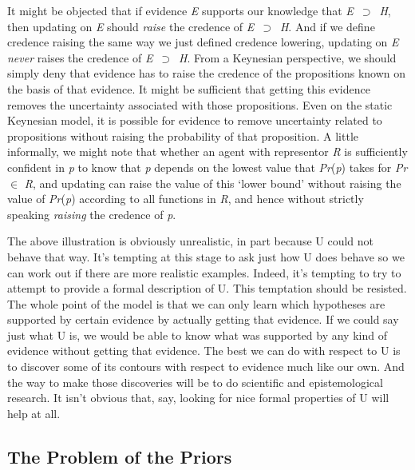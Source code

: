 \documentclass[
  11pt,
  letterpaper,
  DIV=11,
  numbers=noendperiod,
  oneside]{scrartcl}
\begin{document}
It might be objected that if evidence \emph{E} supports our knowledge
that \emph{E}~\({\supset}\)~\emph{H}, then updating on \emph{E} should
\emph{raise} the credence of \emph{E}~\({\supset}\)~\emph{H}. And if we
define credence raising the same way we just defined credence lowering,
updating on \emph{E} \emph{never} raises the credence of
\emph{E}~\({\supset}\)~\emph{H}. From a Keynesian perspective, we should
simply deny that evidence has to raise the credence of the propositions
known on the basis of that evidence. It might be sufficient that getting
this evidence removes the uncertainty associated with those
propositions. Even on the static Keynesian model, it is possible for
evidence to remove uncertainty related to propositions without raising
the probability of that proposition. A little informally, we might note
that whether an agent with representor \emph{R} is sufficiently
confident in \emph{p} to know that \emph{p} depends on the lowest value
that \emph{Pr}(\emph{p}) takes for \emph{Pr} \({\in}\) \emph{R}, and
updating can raise the value of this `lower bound' without raising the
value of \emph{Pr}(\emph{p}) according to all functions in \emph{R}, and
hence without strictly speaking \emph{raising} the credence of \emph{p}.

The above illustration is obviously unrealistic, in part because U could
not behave that way. It's tempting at this stage to ask just how U does
behave so we can work out if there are more realistic examples. Indeed,
it's tempting to try to attempt to provide a formal description of U.
This temptation should be resisted. The whole point of the model is that
we can only learn which hypotheses are supported by certain evidence by
actually getting that evidence. If we could say just what U is, we would
be able to know what was supported by any kind of evidence without
getting that evidence. The best we can do with respect to U is to
discover some of its contours with respect to evidence much like our
own. And the way to make those discoveries will be to do scientific and
epistemological research. It isn't obvious that, say, looking for nice
formal properties of U will help at all.

\subsection{The Problem of the Priors}\label{the-problem-of-the-priors}
\end{document}
